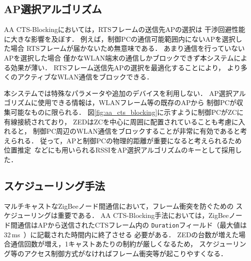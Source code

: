 \documentclass[technicalreport]{ieicej}
\begin{document}
\subsection{AP選択アルゴリズム}
\label{ssec:select_ap}

AA CTS-Blockingにおいては，RTSフレームの送信先APの選択は
干渉回避性能に大きな影響を及ぼす．
例えば，制御PCの通信可能範囲内にないAPを選択した場合
RTSフレームが届かないため無意味である．
あまり通信を行っていないAPを選択した場合
僅かなWLAN端末の通信しかブロックできず本システムによる効果が薄い．
RTSフレーム送信先APの選択を最適化することにより，
より多くのアクティブなWLAN通信をブロックできる．

本システムでは特殊なパラメータや追加のデバイスを利用しない．
AP選択アルゴリズムに使用できる情報は，WLANフレーム等の既存のAPから
制御PCが収集可能なものに限られる．
図\ref{fig:aa_cts_blocking}に示すように制御PCがZCに有線接続されており，
ZEDはZCを中心に周囲に配置されていることも考慮に入れると，
制御PC周辺のWLAN通信をブロックすることが非常に有効であると考えられる．
従って，APと制御PCの物理的距離が重要になると考えられるため
位置推定~\cite{izumi13:}などにも用いられるRSSIをAP選択アルゴリズムのキーとして採用した．

\subsection{スケジューリング手法}
\label{ssec:design}

マルチキャストなZigBeeノード間通信において，フレーム衝突を防ぐための
スケジューリングは重要である．
AA CTS-Blocking手法においては，ZigBeeノード間通信はAPから送信されたCTSフレーム内の
\texttt{Duration}フィールド（最大値は32\,ms~\cite{Bellardo09:}）に記載された時間内に終了させる
必要がある．
ZEDの台数が増えた場合通信回数が増え，1キャストあたりの制約が厳しくなるため，
スケジューリング等のアクセス制御方式がなければフレーム衝突等が起こりやすくなる．
\end{document}
